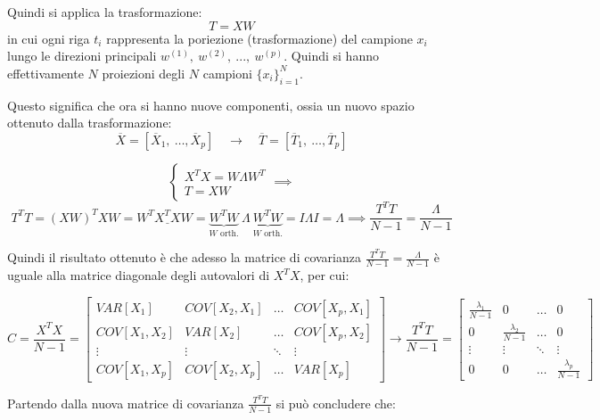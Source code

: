 	\begin{mybox}
		Quindi si applica la trasformazione:
		$$
		T=XW
		$$
		in cui ogni riga $t_i$ rappresenta la poriezione (trasformazione) del campione $x_i$ lungo le direzioni principali $w^{(1)},\ w^{(2)},\ ...,\ w^{(p)}$. Quindi si hanno effettivamente $N$ proiezioni degli $N$ campioni $\{x_i\}_{i=1}^N$.\myvspace
		
		Questo significa che ora si hanno nuove componenti, ossia un nuovo spazio ottenuto dalla trasformazione:
		$$
		\overline{X}=\left[\overline{X}_1,\ \dots, \overline{X}_p\right] \quad\rightarrow\quad \overline{T}=\left[\overline{T}_1,\ \dots, \overline{T}_p\right]
		$$
	\end{mybox}
	\begin{myboxb}
		$$
		\begin{cases}X^TX=W\Lambda W^T\\
			T=XW\end{cases}\implies
			$$
			$$
		T^TT=(XW)^TXW=W^T\underline{X^TX}W=\underbrace{W^TW}_{W\text{ orth.}}\ \Lambda\ \underbrace{W^TW}_{W\text{ orth.}}=I\Lambda I=\Lambda\implies \frac{T^TT}{N-1}=\frac{\Lambda}{N-1}
		$$
		
		Quindi il risultato ottenuto è che adesso la matrice di covarianza $\frac{T^TT}{N-1}=\frac{\Lambda}{N-1}$ è uguale alla matrice diagonale degli autovalori di $X^TX$, per cui:
		
		$$
		C=\frac{X^TX}{N-1}=\begin{bmatrix}
			VAR[X_1] & COV[X_2,X_1] & \dots & COV[X_p,X_1] \\
			COV[X_1,X_2] & VAR[X_2] & \dots & COV[X_p,X_2]\\
			\vdots & \vdots & \ddots & \vdots \\
			COV[X_1,X_p] & COV[X_2,X_p] & \dots & VAR[X_p]
		\end{bmatrix}\rightarrow
		\frac{T^TT}{N-1}=\begin{bmatrix}
			\frac{\lambda_1}{N-1} & 0 & \dots & 0 \\
			0 & \frac{\lambda_2}{N-1} & \dots & 0\\
			\vdots & \vdots & \ddots & \vdots \\
			0 & 0 & \dots & \frac{\lambda_p}{N-1}
		\end{bmatrix}
		$$
		
		Partendo dalla nuova matrice di covarianza $\frac{T^TT}{N-1}$ si può concludere che:
		

\end{myboxb}
